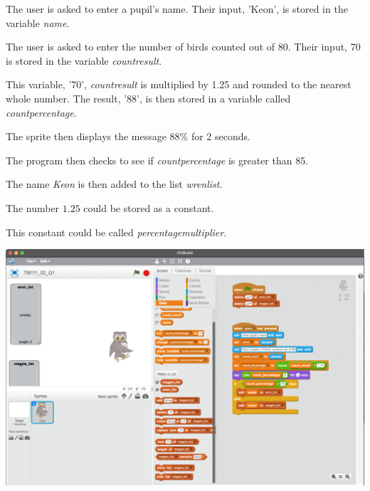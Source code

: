 \documentclass{article}
\begin{document}
 

\begin{question}

\qpart

The user is asked to enter a pupil's name. Their input, 'Keon', is stored in the 
variable \textit{name}.

The user is asked to enter the number of birds counted out of 80. Their input, 
70 is stored in the variable \textit{count\textunderscore result}.

This variable, '70', \textit{count\textunderscore result} is multiplied by 1.25 and rounded to the nearest whole number.
The result, '88', is then stored in a variable called \textit{count\textunderscore percentage}.

The sprite then displays the message 88\% for 2 seconds.

The program then checks to see if \textit{count\textunderscore percentage} is greater than 85.

The name \textit{Keon} is then added to the list \textit{wren\textunderscore list}.

\qpart
\qsubpart

The number \(1.25\) could be stored as a constant.

\qsubpart

This constant could be called \textit{percentage\textunderscore multiplier}.

\qpart

\includegraphics[scale=0.25]{question_1_c.png}

\clearpage

\qpart
\qsubpart


\end{question}
\end{document}
